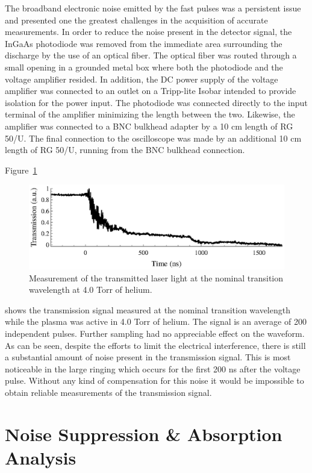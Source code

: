 The broadband electronic noise emitted by the fast pulses was a persistent issue
and presented one the greatest challenges in the acquisition of accurate
measurements. In order to reduce the noise present in the detector signal, the
InGaAs photodiode was removed from the immediate area surrounding the discharge
by the use of an optical fiber. The optical fiber was routed through a small
opening in a grounded metal box where both the photodiode and the voltage
amplifier resided. In addition, the DC power supply of the voltage amplifier was
connected to an outlet on a Tripp-lite Isobar intended to provide isolation for
the power input. The photodiode was connected directly to the input terminal of
the amplifier minimizing the length between the two. Likewise, the amplifier was
connected to a BNC bulkhead adapter by a 10 cm length of RG 50/U. The final
connection to the oscilloscope was made by an additional 10 cm length of RG
50/U, running from the BNC bulkhead connection.

Figure~\ref{fig:transmitted}
\begin{figure}
  \centering
  \includegraphics{./chapters/metastables/figures/transmitted.eps}
  \caption{Measurement of the transmitted laser light at the nominal transition
  wavelength at 4.0 Torr of helium.}
  \label{fig:transmitted}
\end{figure}
shows the transmission signal measured at the nominal transition wavelength
while the plasma was active in 4.0 Torr of helium. The signal is an average of
200 independent pulses. Further sampling had no appreciable effect on the
waveform. As can be seen, despite the efforts to limit the electrical
interference, there is still a substantial amount of noise present in the
transmission signal. This is most noticeable in the large ringing which occurs
for the first 200 ns after the voltage pulse. Without any kind of compensation
for this noise it would be impossible to obtain reliable measurements of the
transmission signal.

\section{Noise Suppression \& Absorption Analysis}

